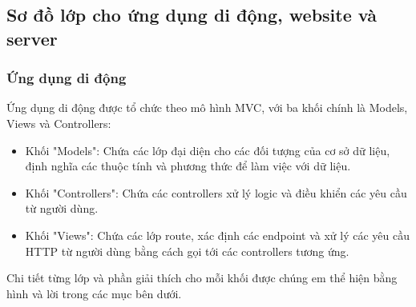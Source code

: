 \subsection{Sơ đồ lớp cho ứng dụng di động, website và server}

\subsubsection{Ứng dụng di động}


Ứng dụng di động được tổ chức theo mô hình MVC, với ba khối chính là Models, Views và Controllers:
  
\begin{itemize}
  \item Khối "Models": Chứa các lớp đại diện cho các đối tượng của cơ sở dữ liệu, định nghĩa các thuộc tính và phương thức để làm việc với dữ liệu.
 
  \item Khối "Controllers": Chứa các controllers xử lý logic và điều khiển các yêu cầu từ người dùng.

  \item Khối "Views": Chứa các lớp route, xác định các endpoint và xử lý các yêu cầu HTTP từ người dùng bằng cách gọi tới các controllers tương ứng.
\end{itemize}

Chi tiết từng lớp và phần giải thích cho mỗi khối được chúng em thể hiện bằng hình và lời trong các mục bên dưới. 

